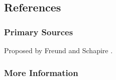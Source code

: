 \subsection{References}

\subsubsection{Primary Sources}

Proposed by Freund and Schapire \cite{Freund1997}.

\subsubsection{More Information}



